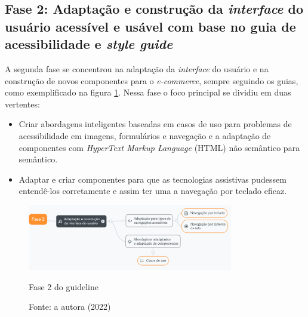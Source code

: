 \subsection{Fase 2: Adaptação e construção da \textit{interface} do usuário acessível e usável com base no guia de acessibilidade e \textit{style guide}}
{A segunda fase se concentrou na adaptação da \textit{interface} do usuário e na construção de novos componentes para o \textit{e-commerce}, sempre seguindo os guias, como exemplificado na figura \ref{guideline-f3}. Nessa fase o foco principal se dividiu em duas vertentes:
\begin{itemize}
\item Criar abordagens inteligentes baseadas em casos de uso para problemas de acessibilidade em imagens, formulários e navegação e a adaptação de componentes com \textit{HyperText Markup Language} (HTML) \cite{flatschart2011html}  não semântico para semântico.
\item  Adaptar e criar componentes para que as tecnologias assistivas pudessem entendê-los corretamente e assim ter uma a navegação por teclado eficaz.

\end{itemize}

\begin{figure}[ht]
    \centering
	\includegraphics[width=0.8\textwidth]{images/guideline-f2.png}
    \caption{Fase 2 do guideline}
    \caption*{Fonte: a autora (2022)}
    \label{guideline-f3}
\end{figure} 
}
